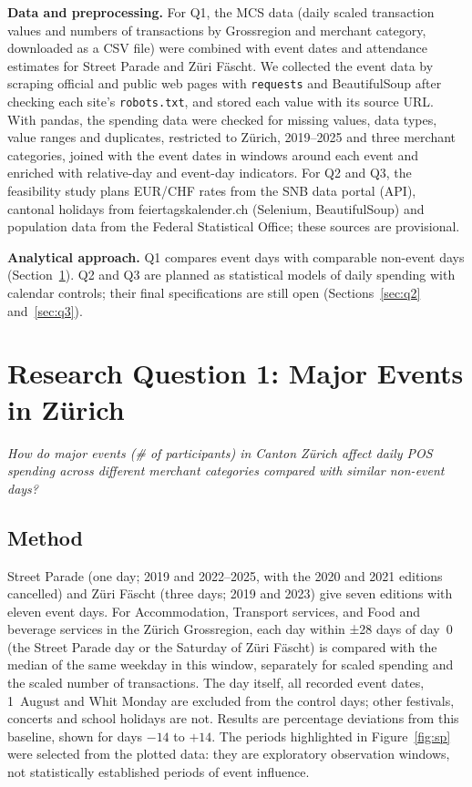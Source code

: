 \documentclass[10pt]{article}
\newcommand{\researchquestion}[1]{%
  \begin{tcolorbox}[blank,left=3.4mm,top=0.6mm,bottom=0.6mm,borderline west={1.8pt}{0pt}{bluerule}]
  {\itshape\color{navy}#1}
  \end{tcolorbox}}
\let\plainsection\section
\renewcommand{\section}{\Needspace*{6\baselineskip}\plainsection}
\begin{document}
\textbf{Data and preprocessing.} For Q1, the MCS data (daily scaled transaction values and numbers of transactions by Grossregion and merchant category, downloaded as a CSV file) were combined with event dates and attendance estimates for Street Parade and Züri Fäscht. We collected the event data by scraping official and public web pages with \texttt{requests} and BeautifulSoup after checking each site's \texttt{robots.txt}, and stored each value with its source URL. With pandas, the spending data were checked for missing values, data types, value ranges and duplicates, restricted to Zürich, 2019--2025 and three merchant categories, joined with the event dates in windows around each event and enriched with relative-day and event-day indicators. For Q2 and Q3, the feasibility study plans EUR/CHF rates from the SNB data portal (API), cantonal holidays from feiertagskalender.ch (Selenium, BeautifulSoup) and population data from the Federal Statistical Office; these sources are provisional.

\textbf{Analytical approach.} Q1 compares event days with comparable non-event days (Section~\ref{sec:q1}). Q2 and Q3 are planned as statistical models of daily spending with calendar controls; their final specifications are still open (Sections~\ref{sec:q2} and~\ref{sec:q3}).

\section{Research Question 1: Major Events in Zürich}
\label{sec:q1}
\researchquestion{How do major events (\# of participants) in Canton Zürich affect daily POS spending across different merchant categories compared with similar non-event days?}

\subsection{Method}
Street Parade (one day; 2019 and 2022--2025, with the 2020 and 2021 editions cancelled) and Züri Fäscht (three days; 2019 and 2023) give seven editions with eleven event days. For Accommodation, Transport services, and Food and beverage services in the Zürich Grossregion, each day within ±28 days of day~0 (the Street Parade day or the Saturday of Züri Fäscht) is compared with the median of the same weekday in this window, separately for scaled spending and the scaled number of transactions. The day itself, all recorded event dates, 1~August and Whit Monday are excluded from the control days; other festivals, concerts and school holidays are not. Results are percentage deviations from this baseline, shown for days $-14$ to $+14$. The periods highlighted in Figure~\ref{fig:sp} were selected from the plotted data: they are exploratory observation windows, not statistically established periods of event influence.
\end{document}
